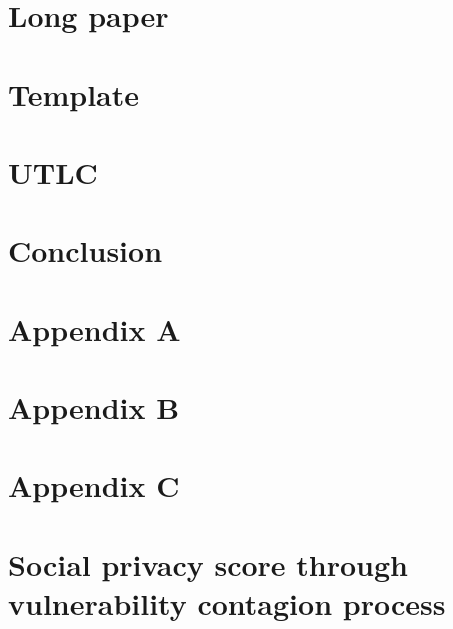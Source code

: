 \documentclass[conference]{../../setup/IEEEtran}
\begin{document}
\begin{refsection}
\chapter[''I can’t remember the last day I didn’t train'' - Michael Phelps]{Long paper}
	
	
	
	
	
	
	
	
\chapter{Template}
	
	
	
	
	
	
	
\chapter{UTLC}
	
	
	
	
	
	
	
	
\chapter[''Everything that has a beginning has an ending. Make your peace with that and all will be well'' - Jack Kornfield]{Conclusion}
	

\Appendix
\chapter{Appendix A}
	
	
	
	
	
	
	
	
\chapter{Appendix B}
	
	
	
\chapter{Appendix C}
	
\chapter{Social privacy score through vulnerability contagion process}
	
	
	
	
	
	
	
	

\end{refsection}
\end{document}
